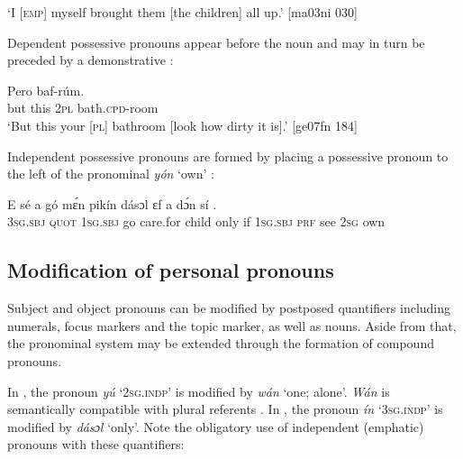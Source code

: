 \glt ‘I \textsc{[emp]} myself brought them [the children] all up.’ [ma03ni 030]
\z

Dependent possessive pronouns appear before the noun and may in turn be preceded by a demonstrative :


\ea%
    \label{ex:key:287}
    \gll Pero       baf-rúm.\\
but    this  \textsc{2pl}    bath.\textsc{cpd}{}-room\\

\glt ‘But this your [\textsc{pl}] bathroom [look how dirty it is].’ [ge07fn 184]
\z

Independent possessive pronouns are formed by placing a possessive pronoun to the left of the pronominal \textit{yón} ‘own’ :


\ea%
    \label{ex:key:288}
    \gll E    sé    a    gó  mɛ́n    pikín  dásɔl  ɛf  a
dɔ́n  sí   .\\
\textsc{3sg.sbj}  \textsc{quot}  \textsc{1sg.sbj}  go  care.for  child  only    if  \textsc{1sg.sbj}
\textsc{prf}  see  \textsc{2sg}  own\\

\glt {}
\z

\subsection{Modification of personal pronouns}\label{sec:5.4.2}

Subject and object pronouns can be modified by postposed quantifiers including numerals, focus markers and the topic marker, as well as nouns. Aside from that, the pronominal system may be extended through the formation of compound pronouns.


In , the pronoun \textit{yú} ‘\textsc{2sg.indp}’ is modified by \textit{wán} ‘one; alone’. \textit{Wán} is semantically compatible with plural referents . In , the pronoun \textit{ín} ‘\textsc{3sg.indp}’ is modified by \textit{dásɔl} ‘only’. Note the obligatory use of independent (emphatic) pronouns with these quantifiers: 




